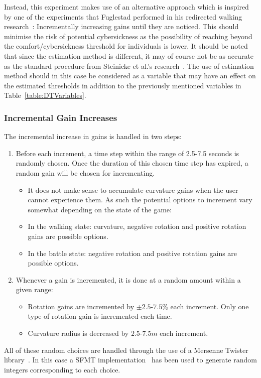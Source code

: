 Instead, this experiment makes use of an alternative approach which is inspired by one of the experiments that Fuglestad performed in his redirected walking research~\cite{fuglestad2018redirected}: Incrementally increasing gains until they are noticed. This should minimise the risk of potential cybersickness as the possibility of reaching beyond the comfort/cybersickness threshold for individuals is lower. It should be noted that since the estimation method is different, it may of course not be as accurate as the standard procedure from Steinicke et al.'s research~\cite{5072212}. The use of estimation method should in this case be considered as a variable that may have an effect on the estimated thresholds in addition to the previously mentioned variables in Table~\ref{table:DTVariables}.

\subsubsection{Incremental Gain Increases}
The incremental increase in gains is handled in two steps:

\begin{enumerate}
    \item Before each increment, a time step within the range of 2.5-7.5 seconds is randomly chosen. Once the duration of this chosen time step has expired, a random gain will be chosen for incrementing.
    \begin{itemize}
        \item It does not make sense to accumulate curvature gains when the user cannot experience them. As such the potential options to increment vary somewhat depending on the state of the game:
        \item In the walking state: curvature, negative rotation and positive rotation gains are possible options.
        \item In the battle state: negative rotation and positive rotation gains are possible options.
    \end{itemize}
    \item Whenever a gain is incremented, it is done at a random amount within a given range:
    \begin{itemize}
        \item Rotation gains are incremented by $\pm2.5$-$7.5\%$ each increment. Only one type of rotation gain is incremented each time.
        \item Curvature radius is decreased by $2.5$-$7.5m$ each increment.
    \end{itemize}
\end{enumerate}
All of these random choices are handled through the use of a Mersenne Twister library~\cite{MersenneTwisterLibraryLink}. In this case a SFMT implementation~\cite{saito2008simd} has been used to generate random integers corresponding to each choice. 

